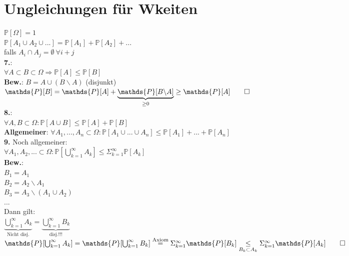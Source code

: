 \section{Ungleichungen für Wkeiten}
$\mathds{P}[\Omega] = 1$\\
$\mathds{P}[A_1\cup A_2 \cup ...] = \mathds{P}[A_1] + \mathds{P}[A_2]+ ...$\\
falls $A_i \cap A_j = \emptyset \: \forall i+j$\medskip\\
\textbf{7.}:\\
$\forall  A \subset B \subset \Omega \Rightarrow \mathds{P}[A] \leq \mathds{P}[B]$\\
\textbf{Bew.}: $B=A\cup(B\backslash A)$ (disjunkt)\\
$\mathds{P}[B]=\mathds{P}[A]+\underbrace{\mathds{P}[B\backslash A]}_{\geq 0} \geq \mathds{P}[A] \qed$\medskip\\
\textbf{8.}:\\
$\forall A, B \subset \Omega : \mathds{P}[A\cup B] \leq \mathds{P}[A] + \mathds{P}[B]$\medskip\\
\textbf{Allgemeiner}: $\forall A_1,...,A_n \subset \Omega : \mathds{P}[A_1\cup ...\cup A_n] \leq \mathds{P} [A_1]+...+\mathds{P}[A_n]$\medskip\\
\textbf{9. } Noch allgemeiner:\\
$\forall A_1,A_2,... \subset \Omega : \mathds{P}[\bigcup_{k=1}^\infty A_k] \leq \Sigma_{k=1}^\infty \mathds{P}[A_k]$\\
\textbf{Bew.}:\\
$B_1 = A_1$\\
$B_2 = A_2\backslash A_1$\\
$B_3 = A_3\backslash(A_1 \cup A_2)$\\
...\smallskip\\
Dann gilt:\\
$\underbrace{\bigcup_{k=1}^\infty A_k}_\text{Nicht disj.} = \underbrace{\bigcup_{k=1}^\infty B_k}_\text{disj.!!!}$\medskip\\
$\mathds{P}[\bigcup_{k=1}^\infty A_k] = \mathds{P}[\bigcup_{k=1}^\infty B_k] \overset{\text{Axiom}}{=}\Sigma_{k=1}^\infty \mathds{P}[B_k] \underset{B_k \subset A_k}{\leq} \Sigma_{k=1}^\infty \mathds{P}[A_k] \qed$
